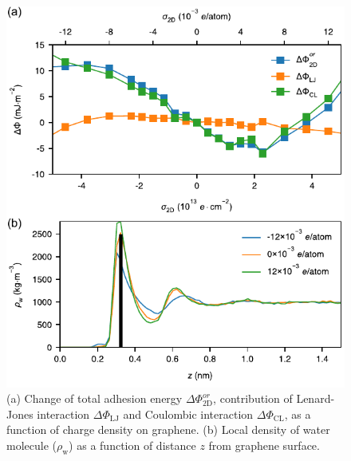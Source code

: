 \documentclass[aps,prl,reprint,groupedaddress,amsmath,amssymb, showpacs]{revtex4-1}
\begin{document}
\begin{figure}[htbp]
\centering
\includegraphics[width=0.9\linewidth]{../img/fig-pot-dens.pdf}
\caption{\label{fig:pot-dens}
(a) Change of total adhesion energy \(\Delta\Phi_{\mathrm{2D}}^{or}\), contribution of Lenard-Jones interaction \(\Delta\Phi_{\mathrm{LJ}}\) and Coulombic interaction \(\Delta\Phi_{\mathrm{CL}}\), as a function of charge density on graphene. (b) Local density of water molecule (\(\rho_{\mathrm{w}}\))  as a function of distance \(z\) from graphene surface.}
\end{figure}
\end{document}
